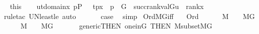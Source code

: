 \begin{isabellebody}
\ \isamarkupfalse%
\ this\isanewline
\ \ \isamarkupfalse%
\ {\isachardoublequoteopen}{\isacharparenleft}{\kern0pt}{\isasymUnion}u{\isasymin}{\isacharbraceleft}{\kern0pt}t{\isasymin}domain{\isacharparenleft}{\kern0pt}x{\isacharparenright}{\kern0pt}{\isachardot}{\kern0pt}\ {\isasymexists}p{\isasymin}P\ {\isachardot}{\kern0pt}\ \ {\isasymlangle}t{\isacharcomma}{\kern0pt}p{\isasymrangle}{\isasymin}x\ {\isasymand}\ p\ {\isasymin}\ G\ {\isacharbraceright}{\kern0pt}{\isachardot}{\kern0pt}\ succ{\isacharparenleft}{\kern0pt}rank{\isacharparenleft}{\kern0pt}val{\isacharparenleft}{\kern0pt}G{\isacharcomma}{\kern0pt}u{\isacharparenright}{\kern0pt}{\isacharparenright}{\kern0pt}{\isacharparenright}{\kern0pt}{\isacharparenright}{\kern0pt}\ {\isasymle}\ rank{\isacharparenleft}{\kern0pt}x{\isacharparenright}{\kern0pt}{\isachardoublequoteclose}\ \isanewline
\ \ \ \ \isamarkupfalse%
\ {\isacharparenleft}{\kern0pt}rule{\isacharunderscore}{\kern0pt}tac\ UN{\isacharunderscore}{\kern0pt}least{\isacharunderscore}{\kern0pt}le{\isacharparenright}{\kern0pt}\ {\isacharparenleft}{\kern0pt}auto{\isacharparenright}{\kern0pt}\isanewline
\ \ \isamarkupfalse%
\isanewline
\ \ \isamarkupfalse%
\ {\isacharquery}{\kern0pt}case\ \isamarkupfalse%
\ simp\isanewline
{}\isamarkupfalse%
%
\endisatagproof
{\isafoldproof}%
%
\isadelimproof
\isanewline
%
\endisadelimproof
\isanewline
{}\isamarkupfalse%
\ Ord{\isacharunderscore}{\kern0pt}MG{\isacharunderscore}{\kern0pt}iff{\isacharcolon}{\kern0pt}\isanewline
\ \ \ {\isachardoublequoteopen}Ord{\isacharparenleft}{\kern0pt}{\isasymalpha}{\isacharparenright}{\kern0pt}{\isachardoublequoteclose}\ \isanewline
\ \ \ {\isachardoublequoteopen}{\isasymalpha}\ {\isasymin}\ M\ {\isasymlongleftrightarrow}\ {\isasymalpha}\ {\isasymin}\ M{\isacharbrackleft}{\kern0pt}G{\isacharbrackright}{\kern0pt}{\isachardoublequoteclose}\isanewline
%
\isadelimproof
%
\endisadelimproof
%
\isatagproof
{}\isamarkupfalse%
\isanewline
\ \ \isamarkupfalse%
\ {\isachardoublequoteopen}{\isasymalpha}\ {\isasymin}\ M\ {\isasymLongrightarrow}\ {\isasymalpha}\ {\isasymin}\ M{\isacharbrackleft}{\kern0pt}G{\isacharbrackright}{\kern0pt}{\isachardoublequoteclose}\ \isanewline
\ \ \ \ \isamarkupfalse%
\ generic{\isacharbrackleft}{\kern0pt}THEN\ one{\isacharunderscore}{\kern0pt}in{\isacharunderscore}{\kern0pt}G{\isacharcomma}{\kern0pt}\ THEN\ M{\isacharunderscore}{\kern0pt}subset{\isacharunderscore}{\kern0pt}MG{\isacharbrackright}{\kern0pt}\ \isacommand{{\isachardot}{\kern0pt}{\isachardot}{\kern0pt}}\isamarkupfalse%

\end{isabellebody}
